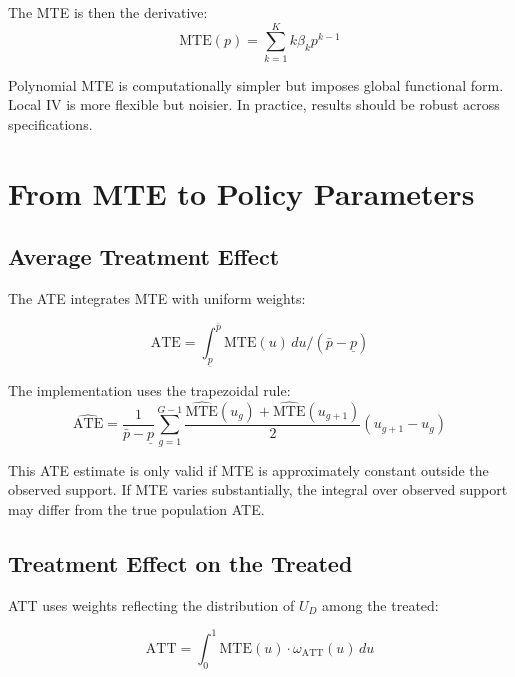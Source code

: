 The MTE is then the derivative:
\begin{equation}
\text{MTE}(p) = \sum_{k=1}^K k \beta_k p^{k-1}
\end{equation}

\begin{remark}
Polynomial MTE is computationally simpler but imposes global functional form. Local IV is more flexible but noisier. In practice, results should be robust across specifications.
\end{remark}

\section{From MTE to Policy Parameters}
\label{sec:mte-policy}

\subsection{Average Treatment Effect}

The ATE integrates MTE with uniform weights:

\begin{equation}
\text{ATE} = \int_{\underline{p}}^{\bar{p}} \text{MTE}(u) \, du \Big/ (\bar{p} - \underline{p})
\end{equation}

The implementation uses the trapezoidal rule:
\begin{equation}
\widehat{\text{ATE}} = \frac{1}{\bar{p} - \underline{p}} \sum_{g=1}^{G-1} \frac{\widehat{\text{MTE}}(u_g) + \widehat{\text{MTE}}(u_{g+1})}{2} (u_{g+1} - u_g)
\end{equation}

\begin{remark}
This ATE estimate is only valid if MTE is approximately constant outside the observed support. If MTE varies substantially, the integral over observed support may differ from the true population ATE.
\end{remark}

\subsection{Treatment Effect on the Treated}

ATT uses weights reflecting the distribution of $U_D$ among the treated:

\begin{equation}
\text{ATT} = \int_0^1 \text{MTE}(u) \cdot \omega_{\text{ATT}}(u) \, du
\end{equation}

